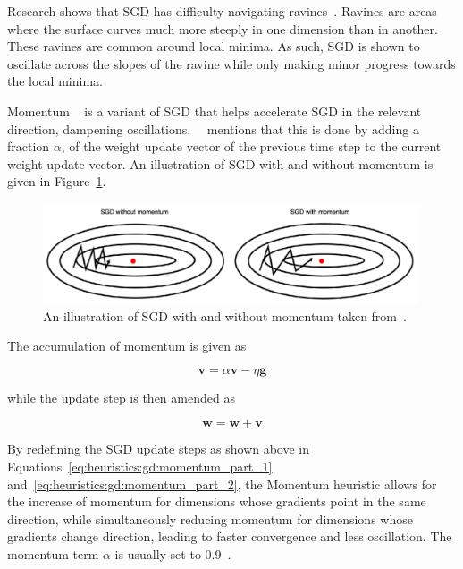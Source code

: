 Research shows that \acs{SGD} has difficulty navigating ravines~\cite{ref:sutton:1986}. Ravines are areas where the surface curves much more steeply in one dimension than in another. These ravines are common around local minima. As such, \acs{SGD} is shown to oscillate across the slopes of the ravine while only making minor progress towards the local minima.

\Acs{Momentum} ~\cite{ref:qian:1999} is a variant of \acs{SGD} that helps accelerate \acs{SGD} in the relevant direction, dampening oscillations.~\citeauthor{ref:ruder:2016}~\cite{ref:ruder:2016} mentions that this is done by adding a fraction $\alpha$, of the weight update vector of the previous time step to the current weight update vector. An illustration of \acs{SGD} with and without momentum is given in Figure~\ref{fig:heuristics:gd:sgd_with_and_without_momentum}.

\begin{figure}[htbp]
      \centering
      \includegraphics[width=0.99\textwidth]{images/sgd_with_and_without_momentum.pdf}
      \caption{An illustration of \acf{SGD} with and without momentum taken from~\cite{ref:du:2019}.}
      \label{fig:heuristics:gd:sgd_with_and_without_momentum}
\end{figure}

The accumulation of momentum is given as

\begin{equation}
      \boldsymbol{v} = \alpha \boldsymbol{v} - \eta \boldsymbol{g}
      \label{eq:heuristics:gd:momentum_part_1}
\end{equation}

while the update step is then amended as

\begin{equation}
      \boldsymbol{w} = \boldsymbol{w} + \boldsymbol{v}
      \label{eq:heuristics:gd:momentum_part_2}
\end{equation}

By redefining the \acs{SGD} update steps as shown above in Equations~\eqref{eq:heuristics:gd:momentum_part_1} and~\eqref{eq:heuristics:gd:momentum_part_2}, the \acs{Momentum} heuristic allows for the increase of momentum for dimensions whose gradients point in the same direction, while simultaneously reducing momentum for dimensions whose gradients change direction, leading to faster convergence and less oscillation. The momentum term $\alpha$ is usually set to 0.9~\cite{ref:engelbrecht:2007, ref:ruder:2016}.

